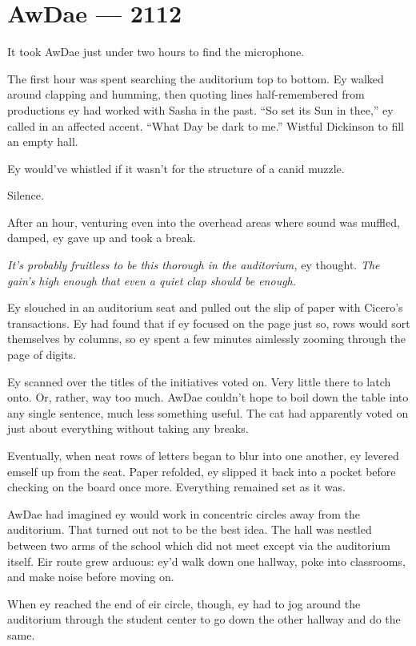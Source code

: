 \hypertarget{rj-brewster-2112}{%
\chapter*{AwDae — 2112}\label{rj-brewster-2112}}

It took AwDae just under two hours to find the microphone.

The first hour was spent searching the auditorium top to bottom. Ey walked around clapping and humming, then quoting lines half-remembered from productions ey had worked with Sasha in the past. ``So set its Sun in thee,'' ey called in an affected accent. ``What Day be dark to me.'' Wistful Dickinson to fill an empty hall.

Ey would've whistled if it wasn't for the structure of a canid muzzle.

Silence.

After an hour, venturing even into the overhead areas where sound was muffled, damped, ey gave up and took a break.

\emph{It's probably fruitless to be this thorough in the auditorium,} ey thought. \emph{The gain's high enough that even a quiet clap should be enough.}

Ey slouched in an auditorium seat and pulled out the slip of paper with Cicero's transactions. Ey had found that if ey focused on the page just so, rows would sort themselves by columns, so ey spent a few minutes aimlessly zooming through the page of digits.

Ey scanned over the titles of the initiatives voted on. Very little there to latch onto. Or, rather, way too much. AwDae couldn't hope to boil down the table into any single sentence, much less something useful. The cat had apparently voted on just about everything without taking any breaks.

Eventually, when neat rows of letters began to blur into one another, ey levered emself up from the seat. Paper refolded, ey slipped it back into a pocket before checking on the board once more. Everything remained set as it was.

AwDae had imagined ey would work in concentric circles away from the auditorium. That turned out not to be the best idea. The hall was nestled between two arms of the school which did not meet except via the auditorium itself. Eir route grew arduous: ey'd walk down one hallway, poke into classrooms, and make noise before moving on.

When ey reached the end of eir circle, though, ey had to jog around the auditorium through the student center to go down the other hallway and do the same.

